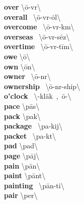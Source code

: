 \documentclass[10pt,a4paper]{article}
\begin{document}
\begin{multicols}{2}
\textbf{ over }\quad \textbackslash \textprimstress \={o}-v\textschwa r\textbackslash \\
\textbf{ overall }\quad \ \textbackslash \textsecstress \={o}-v\textschwa r-\textprimstress \.{o}l\textbackslash \\
\textbf{ overcome }\quad \ \textbackslash \textsecstress \={o}-v\textschwa r-\textprimstress k\textschwa m\textbackslash \\
\textbf{ overseas }\quad \ \textbackslash \textsecstress \={o}-v\textschwa r-\textprimstress s\={e}z\textbackslash \\
\textbf{ overtime }\quad \ \textbackslash \textprimstress \={o}-v\textschwa r-\textsecstress t\={i}m\textbackslash \\
\textbf{ owe }\quad \textbackslash \textprimstress \={o}\textbackslash \\
\textbf{ own }\quad \textbackslash \textprimstress \={o}n\textbackslash \\
\textbf{ owner }\quad \ \textbackslash \textprimstress \={o}-n\textschwa r\textbackslash \\
\textbf{ ownership }\quad \ \textbackslash \textprimstress \={o}-n\textschwa r-\textsecstress ship\textbackslash \\
\textbf{ o’clock }\quad \ \textbackslash \textschwa -\textprimstress kl\"{a}k\ ,\ \={o}-\textbackslash \\
\textbf{ pace }\quad \textbackslash \textprimstress p\={a}s\textbackslash \\
\textbf{ pack }\quad \textbackslash \textprimstress pak\textbackslash \\
\textbf{ package }\quad \ \textbackslash \textprimstress pa-kij\textbackslash \\
\textbf{ packet }\quad \ \textbackslash \textprimstress pa-k\textschwa t\textbackslash \\
\textbf{ pad }\quad \textbackslash \textprimstress pad\textbackslash \\
\textbf{ page }\quad \textbackslash \textprimstress p\={a}j\textbackslash \\
\textbf{ pain }\quad \textbackslash \textprimstress p\={a}n\textbackslash \\
\textbf{ paint }\quad \textbackslash \textprimstress p\={a}nt\textbackslash \\
\textbf{ painting }\quad \ \textbackslash \textprimstress p\={a}n-ti\engma \textbackslash \\
\textbf{ pair }\quad \textbackslash \textprimstress per\textbackslash \\

\end{multicols}
\end{document}
